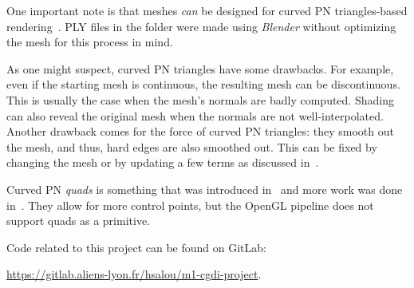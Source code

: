 \documentclass[fontsize=13pt,a4paper,DIV=15,parskip=half]{scrartcl}
\renewcommand{\texttt}[1]{\text{\normalfont\ttfamily#1}}
\theoremstyle{definition}
\let\emph\relax
\newcommand\linkfile[1]{\href{https://gitlab.aliens-lyon.fr/hsalou/m1-cgdi-project/-/blob/master/#1}{\texttt{#1}}}
\begin{document}
  One important note is that meshes \textit{can} be designed for curved PN
  triangles-based rendering~\cite{simplification}. PLY files in the
  \linkfile{data/} folder were made using \textit{Blender} without optimizing
  the mesh for this process in mind.

  As one might suspect, curved PN triangles have some drawbacks. For example,
  even if the starting mesh is continuous, the resulting mesh can be
  discontinuous. This is usually the case when the mesh's normals are badly
  computed. Shading can also reveal the original mesh when the normals are not
  well-interpolated. Another drawback comes for the force of curved PN
  triangles: they smooth out the mesh, and thus, hard edges are also smoothed
  out. This can be fixed by changing the mesh or by updating a few terms as
  discussed in~\cite{curvedpntriangles}.

  Curved PN \textit{quads} is something that was introduced in~\cite{pnquads}
  and more work was done in~\cite{g1pnquads}. They allow for more control
  points, but the \textsf{OpenGL} pipeline does not support quads as a
  primitive.

  Code related to this project can be found on GitLab:
  \begin{center}
    \url{https://gitlab.aliens-lyon.fr/hsalou/m1-cgdi-project}.
  \end{center}

  \renewcommand\emph[1]{{\em#1}}
  \printbibliography
\end{document}
